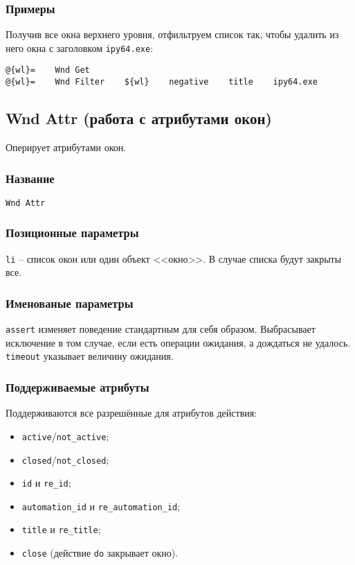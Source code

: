 \documentclass[11pt]{book} %
\begin{document}
\subsubsection*{Примеры}
Получив все окна верхнего уровня, отфильтруем список так, чтобы удалить из него окна с заголовком \verb"ipy64.exe":

\begin{verbatim}
@{wl}=    Wnd Get
@{wl}=    Wnd Filter    ${wl}    negative    title    ipy64.exe
\end{verbatim}


\subsection{Wnd Attr (работа с атрибутами окон)}
Оперирует атрибутами окон.


\subsubsection*{Название} 
\verb"Wnd Attr"

\subsubsection*{Позиционные параметры} 
\verb"li" -- список окон или один объект <<окно>>. В случае списка будут закрыты все.

\subsubsection*{Именованые параметры} 
\verb"assert" изменяет поведение стандартным для себя образом. Выбрасывает исключение в том случае, если есть операции ожидания, а дождаться не удалось.
\verb"timeout" указывает величину ожидания.

\subsubsection*{Поддерживаемые атрибуты} 

Поддерживаются все разрешённые для атрибутов действия:

\begin{itemize}
	\item \verb"active"/\verb"not_active";
	\item \verb"closed"/\verb"not_closed";
	\item \verb"id" и \verb"re_id";
	\item \verb"automation_id" и \verb"re_automation_id";
	\item \verb"title" и \verb"re_title";
	\item \verb"close" (действие \verb"do" закрывает окно).
\end{itemize}
\end{document}
